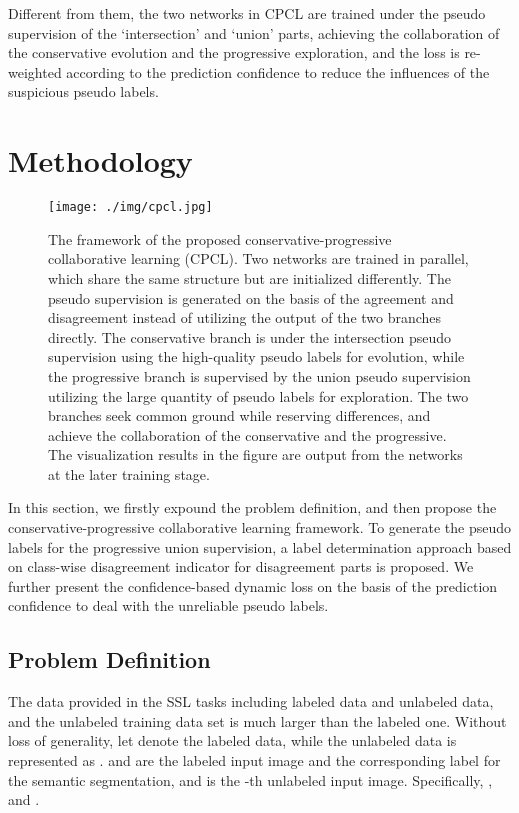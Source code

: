 \documentclass[journal]{IEEEtran}
\begin{document}
Different from them, the two networks in CPCL are trained under the pseudo supervision of the `intersection' and `union' parts, achieving the collaboration of the conservative 
evolution and the progressive exploration, and the loss is re-weighted according to the prediction confidence to reduce the influences of the suspicious pseudo labels.

\section{Methodology}


\begin{figure*}[h]
  \centering
  \texttt{[image: ./img/cpcl.jpg]}
  \caption{The framework of the proposed conservative-progressive collaborative learning (CPCL). Two networks are trained in parallel, which share the same structure but are 
  initialized differently. The pseudo supervision is generated on the basis of the agreement and disagreement instead of utilizing the output of the two branches directly. 
  The conservative branch is under the intersection pseudo supervision using the high-quality pseudo labels for evolution, while the progressive branch is supervised by 
  the union pseudo supervision utilizing the large quantity of pseudo labels for exploration. The two branches seek common ground while reserving differences, and achieve 
  the collaboration of the conservative and the progressive. The visualization results in the figure are output from the networks at the later training stage.}
  \label{fig:cpcl}
\end{figure*}

In this section, we firstly expound the problem definition, and then propose the conservative-progressive collaborative learning framework. To generate the pseudo labels for the progressive 
union supervision, a label determination approach based on class-wise disagreement indicator for disagreement parts is proposed. We further present the confidence-based dynamic 
loss on the basis of the prediction confidence to deal with the unreliable pseudo labels.

\subsection{Problem Definition}

The data provided in the SSL tasks including labeled data and unlabeled data, and the unlabeled training data set is much larger than the labeled one. Without loss of 
generality, let  denote the  labeled data, while the  unlabeled data is represented as 
. 
 and  are the labeled input image and the corresponding label for the semantic segmentation, and  is the -th unlabeled input image. Specifically, 
, and . 
\end{document}
